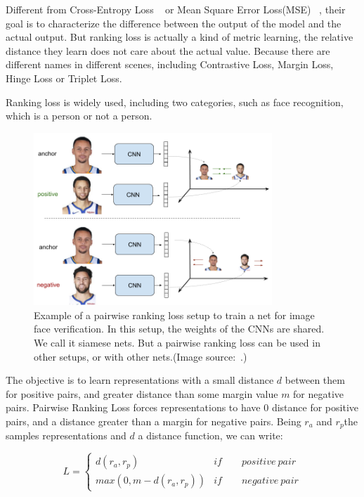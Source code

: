 Different from Cross-Entropy Loss ~\cite{Categorical_Loss} or Mean Square Error Loss(MSE) ~\cite{CHRISTOFFERSEN2004291}, their goal is to characterize the difference between the output of the model and the actual output. But ranking loss is actually a kind of metric learning, the relative distance they learn does not care about the actual value. Because there are different names in different scenes, including Contrastive Loss, Margin Loss, Hinge Loss or Triplet Loss.

Ranking loss is widely used, including two categories, such as face recognition, which is a person or not a person.

\begin{figure}[!htbp]
	\centering
	\includegraphics[width = 0.8\textwidth]{figures/pairwise_ranking_loss_faces.png}
	\caption[Example of a pairwise ranking loss ]
	{ Example of a pairwise ranking loss setup to train a net for image face verification. In this setup, the weights of the CNNs are shared. We call it siamese nets. But a pairwise ranking loss can be used in other setups, or with other nets.(Image source:~\cite{triplet_loss_em}.)}
	\label{fig:pairwise_ranking_loss}
\end{figure}


The objective is to learn representations with a small distance $d$ between them for positive pairs, and greater distance than some margin value $m$ for negative pairs. Pairwise Ranking Loss forces representations to have $0$ distance for positive pairs, and a distance greater than a margin for negative pairs. Being $r_a$ and $r_p$the samples representations and $d$ a distance function, we can write:

\begin{equation}
L=\begin{cases}
	d(r_a,r_p) & if \qquad positive\ pair \\
	max(0,m-d(r_a,r_p)) & if \qquad negative\  pair
\end{cases}
\end{equation}

